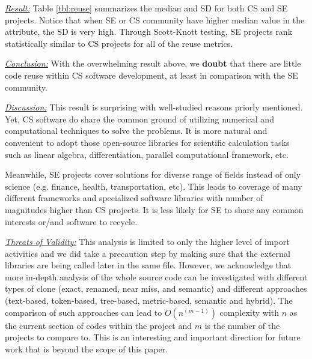 \documentclass[sigconf,review,anonymous]{acmart}
\newenvironment{RQ}{\vspace{1mm}\begin{tcolorbox}[enhanced,width=3.4in,size=fbox,colback=red!5!white,drop shadow southwest,sharp corners]}{\end{tcolorbox}}
\begin{document}
\noindent \textit{\underline{Result:}} Table \ref{tbl:reuse} summarizes the median and SD for both CS and SE projects. Notice that when SE or CS community have higher median value in the attribute, the SD is very high. Through Scott-Knott testing, SE projects rank statistically similar to CS projects for all of the reuse metrics. 

\begin{RQ} 
\textit{\underline{Conclusion:}} With the overwhelming result above, we \textbf{doubt} that there are little code reuse within CS software development, at least in comparison with the SE community. 
\end{RQ}

\noindent \textit{\underline{Discussion:}} This result is surprising with well-studied reasons priorly mentioned. Yet, CS software do share the common ground of utilizing numerical and computational techniques to solve the problems. It is more natural and convenient to adopt those open-source libraries for scientific calculation tasks such as linear algebra, differentiation, parallel computational framework, etc. 

Meanwhile, SE projects cover solutions for diverse range of fields instead of only science (e.g. finance, health, transportation, etc). This leads to coverage of many different frameworks and specialized software libraries with number of magnitudes higher than CS projects. It is less likely for SE to share any common interests or/and software to recycle. 

\noindent \textit{\underline{Threats of Validity:}} This analysis is limited to only the higher level of import activities and we did take a precaution step by making sure that the external libraries are being called later in the same file. However, we acknowledge that more in-depth analysis of the whole source code can be investigated with different types of clone (exact, renamed, near miss, and semantic) and different approaches (text-based, token-based, tree-based, metric-based, semantic and hybrid). The comparison of such approaches can lead to $O(n^{(m-1)})$ complexity with $n$ as the current section of codes within the project and $m$ is the number of the projects to compare to. This is an interesting and important direction for future work that is beyond the scope of this paper.  






\end{document}

